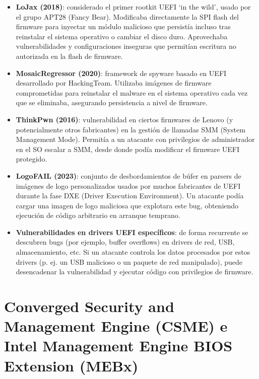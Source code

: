 \documentclass[a4paper,12pt]{article}
\begin{document}
\begin{itemize}[noitemsep]
  \item \textbf{LoJax (2018)}: considerado el primer rootkit UEFI `in the wild', usado por el grupo APT28 (Fancy Bear). Modificaba directamente la SPI flash del firmware para inyectar un módulo malicioso que persistía incluso tras reinstalar el sistema operativo o cambiar el disco duro. Aprovechaba vulnerabilidades y configuraciones inseguras que permitían escritura no autorizada en la flash de firmware.

  \item \textbf{MosaicRegressor (2020)}: framework de spyware basado en UEFI desarrollado por HackingTeam. Utilizaba imágenes de firmware comprometidas para reinstalar el malware en el sistema operativo cada vez que se eliminaba, asegurando persistencia a nivel de firmware.

  \item \textbf{ThinkPwn (2016)}: vulnerabilidad en ciertos firmwares de Lenovo (y potencialmente otros fabricantes) en la gestión de llamadas SMM (System Management Mode). Permitía a un atacante con privilegios de administrador en el SO escalar a SMM, desde donde podía modificar el firmware UEFI protegido.

  \item \textbf{LogoFAIL (2023)}: conjunto de desbordamientos de búfer en parsers de imágenes de logo personalizados usados por muchos fabricantes de UEFI durante la fase DXE (Driver Execution Environment). Un atacante podía cargar una imagen de logo maliciosa que explotara este bug, obteniendo ejecución de código arbitrario en arranque temprano.

  \item \textbf{Vulnerabilidades en drivers UEFI específicos}: de forma recurrente se descubren bugs (por ejemplo, buffer overflows) en drivers de red, USB, almacenamiento, etc. Si un atacante controla los datos procesados por estos drivers (p. ej. un USB malicioso o un paquete de red manipulado), puede desencadenar la vulnerabilidad y ejecutar código con privilegios de firmware.
\end{itemize}

\section{Converged Security and Management Engine (CSME) e Intel Management Engine BIOS Extension (MEBx)}
\end{document}
